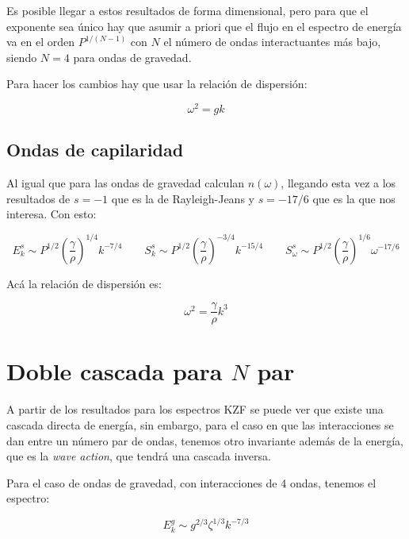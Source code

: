 Es posible llegar a estos resultados de forma dimensional, pero para que el exponente sea único hay que asumir a priori que el flujo en el espectro de energía va en el orden $P^{1/(N-1)}$ con $N$ el número de ondas interactuantes más bajo, siendo $N=4$ para ondas de gravedad.

Para hacer los cambios hay que usar la relación de dispersión:

\begin{equation}
	\omega^2=gk
\end{equation}

\subsection*{Ondas de capilaridad \cite{zakharovWeakTurbulenceCapillary1971}}
Al igual que para las ondas de gravedad calculan $n(\omega)$, llegando esta vez a los resultados de $s=-1$ que es la de Rayleigh-Jeans y $s=-17/6$ que es la que nos interesa. Con esto:

\begin{equation}
	E_k^s \sim P^{1/2} \left(\frac{\gamma}{\rho}\right)^{1/4} k^{-7/4} \qquad S_k^s \sim P^{1/2} \left(\frac{\gamma}{\rho}\right)^{-3/4} k^{-15/4} \qquad S_\omega^s  \sim P^{1/2} \left(\frac{\gamma}{\rho}\right)^{1/6} \omega^{-17/6}
\end{equation}   

Acá la relación de dispersión es:

\begin{equation}
	\omega^2 = \frac{\gamma}{\rho}k^3
\end{equation}



\section{Doble cascada para $N$ par} %
A partir de los resultados para los espectros KZF se puede ver que existe una cascada directa de energía, sin embargo, para el caso en que las interacciones se dan entre un número par de ondas, tenemos otro invariante además de la energía, que es la \textit{wave action}, que tendrá una cascada inversa. \cite{nazarenkoWaveTurbulence2011}

Para el caso de ondas de gravedad, con interacciones de 4 ondas, tenemos el espectro:

\begin{equation}
	E^g_k \sim g^{2/3} \zeta^{1/3} k^{-7/3}
\end{equation}

